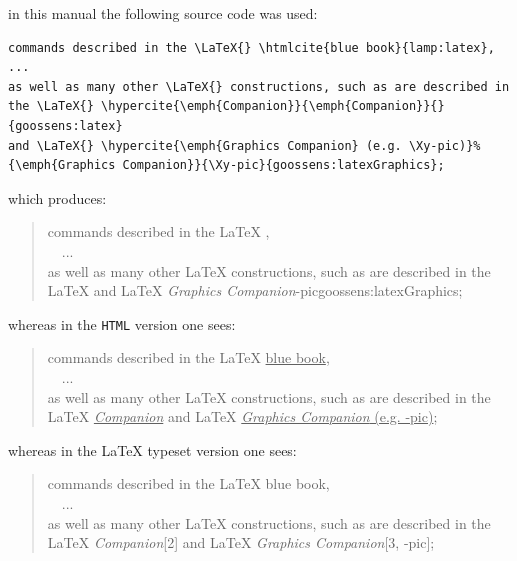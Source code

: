 \smallskip\noindent\label{hyperciteXmpl}%
%
\html{\\}\noindent
{} in this manual the following source code was used:
\begin{small}
\begin{verbatim}
commands described in the \LaTeX{} \htmlcite{blue book}{lamp:latex}, 
...
as well as many other \LaTeX{} constructions, such as are described in 
the \LaTeX{} \hypercite{\emph{Companion}}{\emph{Companion}}{}{goossens:latex} 
and \LaTeX{} \hypercite{\emph{Graphics Companion} (e.g. \Xy-pic)}%
{\emph{Graphics Companion}}{\Xy-pic}{goossens:latexGraphics};
\end{verbatim}
\end{small}
which produces:
\begin{quote}
commands described in the \LaTeX{} , 
\\~~...\\
as well as many other \LaTeX{} constructions, such as are described in 
the \LaTeX{}  
and \LaTeX{} %
{\emph{Graphics Companion}}{\Xy-pic}{goossens:latexGraphics};
\end{quote}
\begin{latexonly}
whereas in the \texttt{HTML} version one sees:
\begin{quote}
commands described in the \LaTeX{} \underline{blue book}, 
\\~~...\\
as well as many other \LaTeX{} constructions, 
such as are described in the \LaTeX{} \underline{\emph{Companion}} 
and  \LaTeX{} \underline{\emph{Graphics Companion} (e.g. \Xy-pic)};
\end{quote}
\end{latexonly}
%
\begin{htmlonly}
whereas in the \LaTeX{} typeset version one sees:
\begin{quote}
commands described in the \LaTeX{} blue book,\\
~~...\\
as well as many other \LaTeX{} constructions, such as are described in the \LaTeX{} 
\textit{Companion}[2] and \LaTeX{} \textit{Graphics Companion}[3, \Xy-pic];
\end{quote}
\end{htmlonly}


